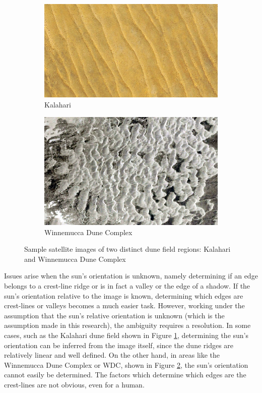 \begin{figure}[htbp]
	\centering
	\begin{subfigure}[b]{0.3\textwidth}
		\centering
		\includegraphics[width=\textwidth]{figures/kalahari}
		\caption{ Kalahari }
		\label{fig:intro_kalahari_image}
	\end{subfigure}
	\begin{subfigure}[b]{0.3\textwidth}
		\centering
		\includegraphics[width=\textwidth]{figures/wdc}
		\caption{ Winnemucca Dune Complex }
		\label{fig:intro_wdc_image}
	\end{subfigure}
	\caption{Sample satellite images of two distinct dune field regions: Kalahari and  Winnemucca Dune Complex }
	\label{fig:intro_sample_images}
\end{figure}

Issues arise when the sun's orientation is unknown, namely determining if an edge belongs to a crest-line ridge or is in fact a valley or the edge of a shadow. If the sun's orientation relative to the image is known, determining which edges are crest-lines or valleys becomes a much easier task. However, working under the assumption that the sun's relative orientation is unknown (which is the assumption made in this research), the ambiguity requires a resolution. In some cases, such as the Kalahari dune field shown in Figure \ref{fig:intro_kalahari_image}, determining the sun's orientation can be inferred from the image itself, since the dune ridges are relatively linear and well defined. On the other hand, in areas like the Winnemucca Dune Complex or WDC, shown in Figure \ref{fig:intro_wdc_image}, the sun's orientation cannot easily be determined. The factors which determine which edges are the crest-lines are not obvious, even for a human.

